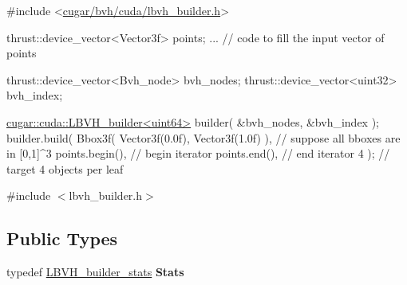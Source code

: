 \begin{DoxyCode}
\textcolor{preprocessor}{#include <\hyperlink{lbvh__builder_8h}{cugar/bvh/cuda/lbvh\_builder.h}>}

thrust::device\_vector<Vector3f> points;
... \textcolor{comment}{// code to fill the input vector of points}

thrust::device\_vector<Bvh\_node> bvh\_nodes;
thrust::device\_vector<uint32>   bvh\_index;

\hyperlink{structcugar_1_1cuda_1_1_l_b_v_h__builder}{cugar::cuda::LBVH\_builder<uint64>} builder( &bvh\_nodes, &bvh\_index );
builder.build(
    Bbox3f( Vector3f(0.0f), Vector3f(1.0f) ),   \textcolor{comment}{// suppose all bboxes are in [0,1]^3}
    points.begin(),                             \textcolor{comment}{// begin iterator}
    points.end(),                               \textcolor{comment}{// end iterator}
    4 );                                        \textcolor{comment}{// target 4 objects per leaf}
\end{DoxyCode}
 

{\ttfamily \#include $<$lbvh\+\_\+builder.\+h$>$}

\subsection*{Public Types}
\begin{DoxyCompactItemize}
\item 
\mbox{\label{structcugar_1_1cuda_1_1_l_b_v_h__builder_aa77f410c55c8e76a68b38b1a7ab8b61c}} 
typedef \hyperlink{structcugar_1_1cuda_1_1_l_b_v_h__builder__stats}{L\+B\+V\+H\+\_\+builder\+\_\+stats} {\bfseries Stats}
\end{DoxyCompactItemize}
